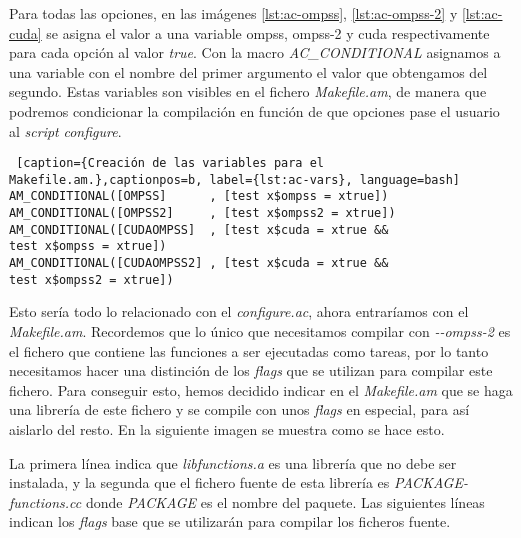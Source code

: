 \par\bigskip

Para todas las opciones, en las imágenes \ref{lst:ac-ompss}, \ref{lst:ac-ompss-2} y \ref{lst:ac-cuda} se asigna el valor a una variable ompss, ompss-2 y cuda respectivamente para cada opción al valor \textit{true}. Con la macro \textit{AC\_CONDITIONAL} asignamos a una variable con el nombre del primer argumento el valor que obtengamos del segundo. Estas variables son visibles en el fichero \textit{Makefile.am}, de manera que podremos condicionar la compilación en función de que opciones pase el usuario al \textit{script} \textit{configure}.

\par\bigskip

\begin{minipage}{\linewidth}
\begin{lstlisting} [caption={Creación de las variables para el Makefile.am.},captionpos=b, label={lst:ac-vars}, language=bash]
AM_CONDITIONAL([OMPSS]      , [test x$ompss = xtrue])
AM_CONDITIONAL([OMPSS2]     , [test x$ompss2 = xtrue])
AM_CONDITIONAL([CUDAOMPSS]  , [test x$cuda = xtrue && 
test x$ompss = xtrue])
AM_CONDITIONAL([CUDAOMPSS2] , [test x$cuda = xtrue && 
test x$ompss2 = xtrue])
\end{lstlisting}
\end{minipage}

\par\bigskip

Esto sería todo lo relacionado con el \textit{configure.ac}, ahora entraríamos con el \textit{Makefile.am}. Recordemos que lo único que necesitamos compilar con \textit{-{}-ompss-2} es el fichero que contiene las funciones a ser ejecutadas como tareas, por lo tanto necesitamos hacer una distinción de los \textit{flags} que se utilizan para compilar este fichero. Para conseguir esto, hemos decidido indicar en el \textit{Makefile.am} que se haga una librería de este fichero y se compile con unos \textit{flags} en especial, para así aislarlo del resto. En la siguiente imagen se muestra como se hace esto.

\par\bigskip

La primera línea indica que \textit{libfunctions.a} es una librería que no debe ser instalada, y la segunda que el fichero fuente de esta librería es \textit{PACKAGE-functions.cc} donde \textit{PACKAGE} es el nombre del paquete. Las siguientes líneas indican los \textit{flags} base que se utilizarán para compilar los ficheros fuente.
 
